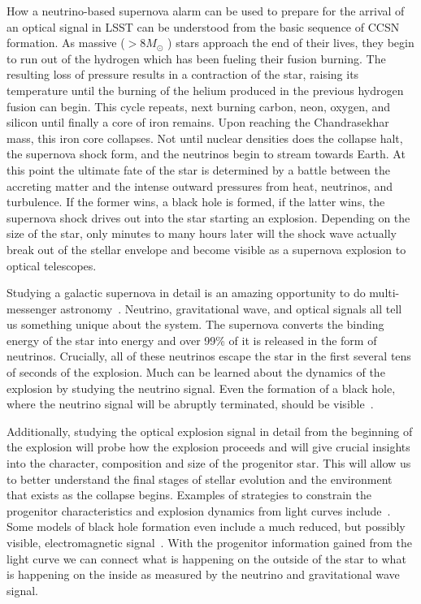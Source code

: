 \documentclass[12pt, letterpaper]{article}
\begin{document}
How a neutrino-based supernova alarm can be used to prepare for the
arrival of an optical signal in LSST can be understood from the basic
sequence of CCSN formation.  As massive ($ > 8 M_\odot$ ) stars
approach the end of their lives, they begin to run out of the hydrogen
which has been fueling their fusion burning.  The resulting loss of
pressure results in a contraction of the star, raising its temperature
until the burning of the helium produced in the previous hydrogen
fusion can begin. This cycle repeats, next burning carbon, neon,
oxygen, and silicon until finally a core of iron remains. Upon
reaching the Chandrasekhar mass, this iron core collapses.  Not until
nuclear densities does the collapse halt, the supernova shock form,
and the neutrinos begin to stream towards Earth.  At this point the
ultimate fate of the star is determined by a battle between the
accreting matter and the intense outward pressures from heat,
neutrinos, and turbulence. If the former wins, a black hole is formed,
if the latter wins, the supernova shock drives out into the star
starting an explosion.  Depending on the size of the star, only
minutes to many hours later will the shock wave actually break out of
the stellar envelope and become visible as a supernova explosion to
optical telescopes.

Studying a galactic supernova in detail is an amazing opportunity to
do multi-messenger astronomy~\cite{2016MNRAS.461.3296N}.  Neutrino,
gravitational wave, and optical signals all tell us something unique
about the system.  The supernova converts the binding energy of the
star into energy and over 99\% of it is released in the form of
neutrinos.  Crucially, all of these neutrinos escape the star in the
first several tens of seconds of the explosion. Much can be learned
about the dynamics of the explosion by studying the neutrino signal.
Even the formation of a black hole, where the neutrino signal will be
abruptly terminated, should be visible~\cite{2011ApJ...730...70O,
  2017hsn..book.1555O}.

Additionally, studying the optical explosion signal in detail from the
beginning of the explosion will probe how the explosion proceeds and
will give crucial insights into the character, composition and size of
the progenitor star.  This will allow us to better understand the
final stages of stellar evolution and the environment that exists as
the collapse begins.  Examples of strategies to constrain the
progenitor characteristics and explosion dynamics from light curves
include~\cite{2010ApJ...725..904N, 2017NatPh..13..510Y,
  2018ApJ...856..146A}.  Some models of black hole formation even
include a much reduced, but possibly visible, electromagnetic
signal~\cite{2013ApJ...769..109L}. With the progenitor information
gained from the light curve we can connect what is happening on the
outside of the star to what is happening on the inside as measured by
the neutrino and gravitational wave signal.
 
\end{document}
